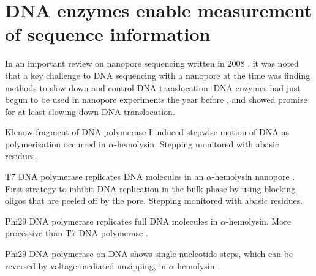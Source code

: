 %
%
%
%
%
%
%
%


\section{DNA enzymes enable measurement of sequence information}

In an important review on nanopore sequencing written in 2008 \citep{Branton2008}, it was noted that a key challenge to DNA sequencing with a nanopore at the time was finding methods to slow down and control DNA translocation.  DNA enzymes had just begun to be used in nanopore experiments the year before \citep{Astier2007, Hornblower2007}, and showed promise for at least slowing down DNA translocation.

Klenow fragment of DNA polymerase I induced stepwise motion of DNA as polymerization occurred \citep{Chu2010} in $\alpha$-hemolysin.  Stepping monitored with abasic residues.

T7 DNA polymerase replicates DNA molecules in an $\alpha$-hemolysin nanopore \citep{Olasagasti2010}.  First strategy to inhibit DNA replication in the bulk phase by using blocking oligos that are peeled off by the pore.  Stepping monitored with abasic residues.

Phi29 DNA polymerase replicates full DNA molecules in $\alpha$-hemolysin.  More processive than T7 DNA polymerase \citep{Lieberman2010}.

Phi29 DNA polymerase on DNA shows single-nucleotide steps, which can be reversed by voltage-mediated unzipping, in $\alpha$-hemolysin \citep{Cherf2012}.

